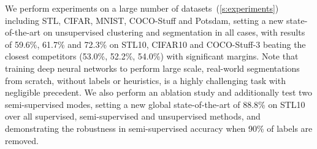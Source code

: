 We perform experiments on a large number of datasets~(\cref{s:experiments}) including STL, CIFAR, MNIST, COCO-Stuff and Potsdam, setting a new state-of-the-art on unsupervised clustering and segmentation in all cases, with results of 59.6\%, 61.7\% and 72.3\% on STL10, CIFAR10 and COCO-Stuff-3 beating the closest competitors (53.0\%, 52.2\%, 54.0\%) with significant margins.
Note that training deep neural networks to perform large scale, real-world segmentations from scratch, without labels or heuristics, is a highly challenging task with negligible precedent.
We also perform an ablation study and additionally test two semi-supervised modes, setting a new global state-of-the-art of 88.8\% on STL10 over all supervised, semi-supervised and unsupervised methods, and demonstrating the robustness in semi-supervised accuracy when 90\% of labels are removed.


